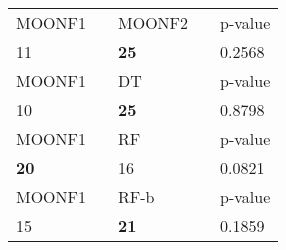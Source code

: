 \begin{tabular}{ l l l l l}
\midrule
{MOONF1} & & {MOONF2} & & {p-value}\\
11 & & \textbf{25} & & 0.2568\\
\midrule
{MOONF1} & & {DT} & & {p-value}\\
10 & & \textbf{25} & & 0.8798\\
\midrule
{MOONF1} & & {RF} & & {p-value}\\
\textbf{20} & & 16 & & 0.0821\\
\midrule
{MOONF1} & & {RF-b} & & {p-value}\\
15 & & \textbf{21} & & 0.1859\\
\midrule
\end{tabular}
